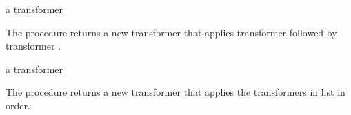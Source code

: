 \begin{procedure}
\end{procedure}
\returns{} a transformer

The  procedure returns a new transformer that applies
transformer  followed by transformer .

\begin{procedure}
\end{procedure}
\returns{} a transformer

The  procedure returns a new transformer that applies the
transformers in list  in order.
